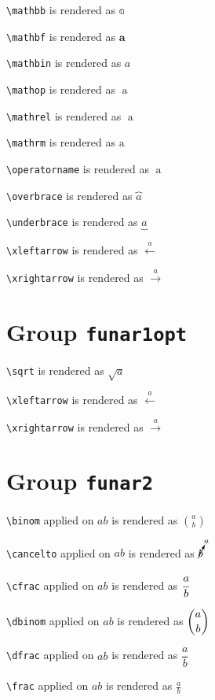 \texttt{\textbackslash mathbb} is rendered as $\mathbb{a}$

\texttt{\textbackslash mathbf} is rendered as $\mathbf{a}$

\texttt{\textbackslash mathbin} is rendered as $\mathbin{a}$

\texttt{\textbackslash mathop} is rendered as $\mathop{a}$

\texttt{\textbackslash mathrel} is rendered as $\mathrel{a}$

\texttt{\textbackslash mathrm} is rendered as $\mathrm{a}$

\texttt{\textbackslash operatorname} is rendered as $\operatorname{a}$

\texttt{\textbackslash overbrace} is rendered as $\overbrace{a}$

\texttt{\textbackslash underbrace} is rendered as $\underbrace{a}$

\texttt{\textbackslash xleftarrow} is rendered as $\xleftarrow{a}$

\texttt{\textbackslash xrightarrow} is rendered as $\xrightarrow{a}$

\section{ Group \texttt{fun\textunderscore ar1opt}}

\texttt{\textbackslash sqrt} is rendered as $\sqrt{a}$

\texttt{\textbackslash xleftarrow} is rendered as $\xleftarrow{a}$

\texttt{\textbackslash xrightarrow} is rendered as $\xrightarrow{a}$

\section{ Group \texttt{fun\textunderscore ar2}}

\texttt{\textbackslash binom} applied on ${a}{b}$ is rendered as $\binom{a}{b}$

\texttt{\textbackslash cancelto} applied on ${a}{b}$ is rendered as $\cancelto{a}{b}$

\texttt{\textbackslash cfrac} applied on ${a}{b}$ is rendered as $\cfrac{a}{b}$

\texttt{\textbackslash dbinom} applied on ${a}{b}$ is rendered as $\dbinom{a}{b}$

\texttt{\textbackslash dfrac} applied on ${a}{b}$ is rendered as $\dfrac{a}{b}$

\texttt{\textbackslash frac} applied on ${a}{b}$ is rendered as $\frac{a}{b}$

